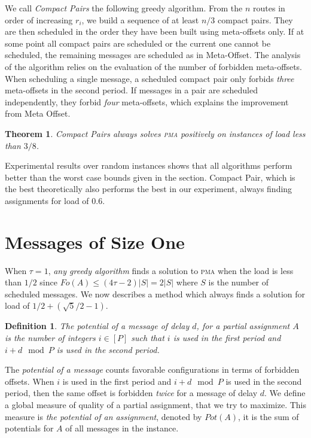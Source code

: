 \documentclass[10pt, conference, letterpaper]{algotel}
\newtheorem{theorem}{Theorem}
\newtheorem{definition}{Definition}
\newcommand\pma{\textsc{pma}\xspace}
\begin{document}
We call \emph{Compact Pairs} the following greedy algorithm. From the $n$ routes in order
of increasing $r_i$, we build a sequence of at least $n/3$ compact pairs. They are then scheduled in the order they have been built using meta-offsets only. If at some point all compact pairs are scheduled or the current one cannot be scheduled, the remaining messages are scheduled as in Meta-Offset. The analysis of the algorithm relies on the evaluation of the number of forbidden meta-offsets. When scheduling a single message, a scheduled compact pair only forbids \emph{three} meta-offsets in the second period. If messages in a pair are scheduled independently, they forbid \emph{four} meta-offsets, which explains the improvement from Meta Offset.

\begin{theorem}
Compact Pairs always solves \pma positively on instances of load less than $3/8$.
\end{theorem}

Experimental results over random instances shows that all algorithms perform better than the worst case bounds given in the section. Compact Pair, which is the best theoretically also performs the best in our experiment, always finding assignments for load of $0.6$. 

 \section{Messages of Size One} \label{sec:small}

When $\tau = 1$, \emph{any greedy algorithm} finds a solution to \pma when the load is less than $1/2$ since $Fo(A) \leq (4\tau -2)|S| = 2|S|$ where $S$ is the number of scheduled messages. We now describes a method which always finds a solution for load of $1/2 + (\sqrt{5}/2 -1)$.
 
\begin{definition}
The potential of a message of delay $d$, for a partial assignment $A$
is the number of integers $i \in [P]$ such that $i$ is used in the first period and $i+d \mod P$ is used in the second period.
\end{definition}

The \emph{potential of a message} counts favorable configurations in terms of forbidden offsets.
When $i$ is used in the first period and $i+d \mod P$ is used in the second period,
then the same offset is forbidden \emph{twice} for a message of delay $d$. 
We define a global measure of quality of a partial assignment, 
that we try to maximize. This measure is \emph{the potential of an assignment}, denoted by $Pot(A)$, it is the sum of potentials for $A$ of all messages in the instance.
\end{document}
